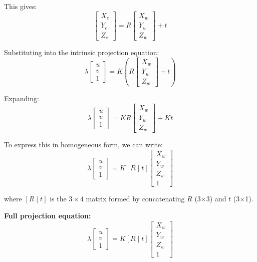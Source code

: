 \documentclass[11pt]{article}
\begin{document}
This gives:
\[
\begin{bmatrix} X_c \\ Y_c \\ Z_c \end{bmatrix} = R \begin{bmatrix} X_w \\ Y_w \\ Z_w \end{bmatrix} + t
\]

Substituting into the intrinsic projection equation:
\[
\lambda \begin{bmatrix} u \\ v \\ 1 \end{bmatrix} = K \left( R \begin{bmatrix} X_w \\ Y_w \\ Z_w \end{bmatrix} + t \right)
\]

Expanding:
\[
\lambda \begin{bmatrix} u \\ v \\ 1 \end{bmatrix} = K R \begin{bmatrix} X_w \\ Y_w \\ Z_w \end{bmatrix} + K t
\]

To express this in homogeneous form, we can write:
\[
\lambda \begin{bmatrix} u \\ v \\ 1 \end{bmatrix} = K [R \mid t] \begin{bmatrix} X_w \\ Y_w \\ Z_w \\ 1 \end{bmatrix}
\]

where $[R \mid t]$ is the $3 \times 4$ matrix formed by concatenating $R$ (3×3) and $t$ (3×1).

\textbf{Full projection equation:}
\[
\boxed{\lambda \begin{bmatrix} u \\ v \\ 1 \end{bmatrix} = K [R \mid t] \begin{bmatrix} X_w \\ Y_w \\ Z_w \\ 1 \end{bmatrix}}
\]
\end{document}
